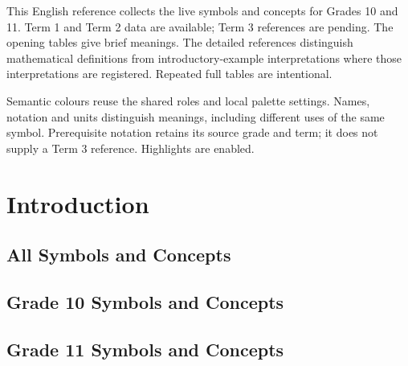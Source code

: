 \newcommand{\PreviewSection}[2]{%
  \clearpage\Needspace{18\baselineskip}\section{#2}\label{#1}\nobreak}
\newcommand{\PreviewSubsection}[2]{%
  \Needspace{14\baselineskip}\subsection{#2}\label{#1}\nobreak}
\newcommand{\PreviewFullTerm}[2]{%
  \PreviewSubsection{preview:g#1t#2-full}{Full Term Reference}
  \SpecificHighlightUnion{#1}{#2}{detailed}\PreviewBackToContents}
\newcommand{\PreviewPending}{Reference not yet available.\PreviewBackToContents}
\newcommand{\PreviewTenTone}[2]{%
  \PreviewSubsection{preview:g10t1-#1}{#2}
  \begingroup\GTenToneReference{#1}\endgroup\PreviewBackToContents}
\newcommand{\PreviewElevenTone}[2]{%
  \PreviewSubsection{preview:g11t1-#1}{#2}
  \begingroup
  \PracticeHighlightLegend{G11-T1-#1}
  \Needspace{10\baselineskip}
  \subsubsection*{Definitions and introductory meanings}\nobreak
  \COneToneDetailedReference{#2}\endgroup\PreviewBackToContents}

\maketitle
This English reference collects the live symbols and concepts for Grades 10
and 11. Term 1 and Term 2 data are available; Term 3 references are pending.
The opening tables give brief meanings. The detailed references distinguish
mathematical definitions from introductory-example interpretations where those
interpretations are registered. Repeated full tables are intentional.

Semantic colours reuse the shared roles and local palette settings. Names,
notation and units distinguish meanings, including different uses of the same
symbol. Prerequisite notation retains its source grade and term; it does not
supply a Term 3 reference. Highlights are enabled.
\tableofcontents\label{preview:contents}

\PreviewSection{preview:introduction}{Introduction}
\PreviewSubsection{preview:catalog-all}{All Symbols and Concepts}
\PreviewBackToContents
\PreviewSubsection{preview:catalog-10}{Grade 10 Symbols and Concepts}
\PreviewBackToContents
\PreviewSubsection{preview:catalog-11}{Grade 11 Symbols and Concepts}
\PreviewBackToContents

